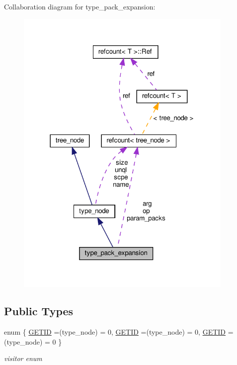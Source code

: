 Collaboration diagram for type\+\_\+pack\+\_\+expansion\+:
\nopagebreak
\begin{figure}[H]
\begin{center}
\leavevmode
\includegraphics[width=297pt]{db/d13/structtype__pack__expansion__coll__graph}
\end{center}
\end{figure}
\subsection*{Public Types}
\begin{DoxyCompactItemize}
\item 
enum \{ \hyperlink{structtype__pack__expansion_a5129e4215f774ea4fcd3afd69338b519af2d93c8f856cc0ab771cf0d650008f36}{G\+E\+T\+ID} =(type\+\_\+node) = 0, 
\hyperlink{structtype__pack__expansion_a5129e4215f774ea4fcd3afd69338b519af2d93c8f856cc0ab771cf0d650008f36}{G\+E\+T\+ID} =(type\+\_\+node) = 0, 
\hyperlink{structtype__pack__expansion_a5129e4215f774ea4fcd3afd69338b519af2d93c8f856cc0ab771cf0d650008f36}{G\+E\+T\+ID} =(type\+\_\+node) = 0
 \}\begin{DoxyCompactList}\small\item\em visitor enum \end{DoxyCompactList}
\end{DoxyCompactItemize}
